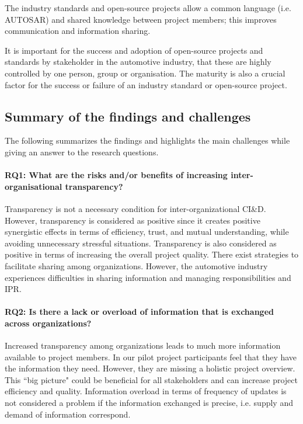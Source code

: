  The industry standards and open-source projects allow a common language (i.e. AUTOSAR) and shared knowledge between project members; this improves communication and information sharing.

 It is important for the success and adoption of open-source projects and standards by stakeholder in the automotive industry, that these are highly controlled by one person, group or organisation. The maturity is also a crucial factor for the success or failure of an industry standard or open-source project.



\subsection{Summary of the findings and challenges}\label{sec:findings_RQs}

The following summarizes the findings and highlights the main challenges while giving an answer to the research questions.

\paragraph*{RQ1: What are the risks and/or benefits of increasing inter-organisational transparency?} %
Transparency is not a necessary condition for inter-organizational CI\&D. However, transparency is considered as positive since it creates positive %
{synergistic} effects in terms of efficiency, trust, and mutual understanding, while avoiding unnecessary stressful situations. Transparency is also considered as positive in terms of increasing the overall project quality. 
There exist strategies to facilitate sharing among organizations. However, the automotive industry experiences difficulties in sharing information and managing responsibilities and IPR.
\paragraph*{RQ2: Is there a lack or overload of information that is exchanged across organizations?} %
Increased transparency among organizations leads to much more information available to project members. In our pilot project participants feel that they have the information they need. However, they are missing a holistic project overview. This ``big picture" could be beneficial for all stakeholders and can increase project efficiency and quality. Information overload in terms of frequency of updates is not considered a problem if the information exchanged is precise, i.e. supply and demand of information correspond.
